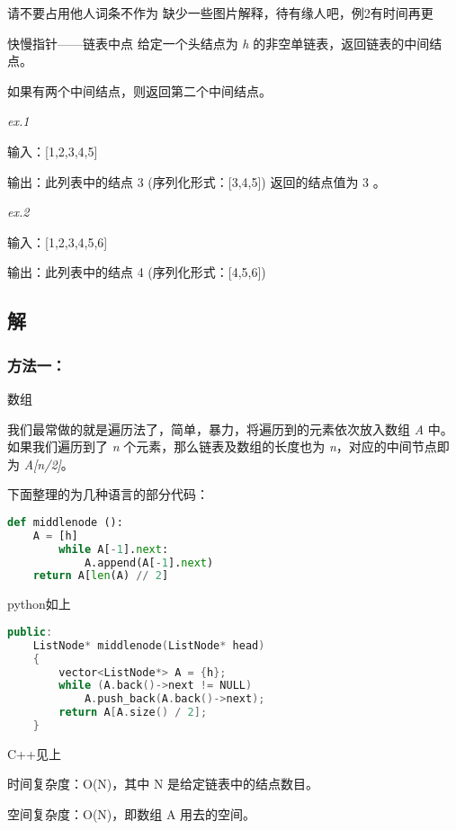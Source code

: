 

\begin{issues}
\issueDraft 请不要占用他人词条不作为
缺少一些图片解释，待有缘人吧，例2有时间再更
\end{issues}

\begin{example}{快慢指针——链表中点}
给定一个头结点为 \textsl{h} 的非空单链表，返回链表的中间结点。

如果有两个中间结点，则返回第二个中间结点。

\textsl{ex.1}

输入：[1,2,3,4,5] 

输出：此列表中的结点 3 (序列化形式：[3,4,5])
返回的结点值为 3 。

\textsl{ex.2}

输入：[1,2,3,4,5,6]

输出：此列表中的结点 4 (序列化形式：[4,5,6])
\end{example}

\subsection{解}
\subsubsection{方法一：}
数组

我们最常做的就是遍历法了，简单，暴力，将遍历到的元素依次放入数组 \textsl{A }中。如果我们遍历到了 \textsl{n }个元素，那么链表及数组的长度也为 \textsl{n}，对应的中间节点即为 \textsl{A[n/2]}。

下面整理的为几种语言的部分代码：
\begin{lstlisting}[language=python]
def middlenode ():
    A = [h]
        while A[-1].next:
            A.append(A[-1].next)
    return A[len(A) // 2]

\end{lstlisting}
python如上
\begin{lstlisting}[language=cpp]
public:
    ListNode* middlenode(ListNode* head) 
    {
        vector<ListNode*> A = {h};
        while (A.back()->next != NULL)
            A.push_back(A.back()->next);
        return A[A.size() / 2];
    }
\end{lstlisting}
C++见上

时间复杂度：O(N)，其中 N 是给定链表中的结点数目。

空间复杂度：O(N)，即数组 A 用去的空间。
